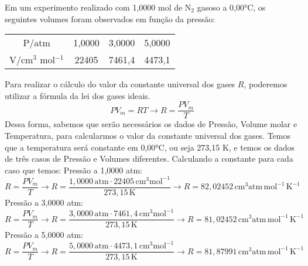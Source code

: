 \begin{xcs}
    Em um experimento realizado com 1,0000 mol de N\(_2\) gasoso a 0,00°C, os
    seguintes volumes foram observados em função da pressão: 
    \begin{center}
    \begin{tabular}{c | c c c}
    \hline
        P/atm & 1,0000 & 3,0000 & 5,0000\\
        V/cm\(^3\) mol\(^{-1}\) & 22405 & 7461,4 & 4473,1\\
    \hline
    \end{tabular}
    \end{center}
\end{xcs}
\begin{rsl}
    Para realizar o cálculo do valor da constante universal dos gases \( R \),
    poderemos utilizar a fórmula da lei dos gases ideais.  
    \[ PV_m = RT \rightarrow R = \frac{PV_m}{T} \] 
    Dessa forma, sabemos que serão necessários
    os dados de Pressão, Volume molar e Temperatura, para calcularmos o valor da
    constante universal dos gases.  Temos que a temperatura será constante em
    0,00°C, ou seja 273,15 K, e temos os dados de três casos de Pressão e
    Volumes diferentes.  Calculando a constante para cada caso que temos:
    Pressão a 1,0000 atm: 
    \[ R = \frac{PV_m}{T} \rightarrow R = \frac{1,0000 \, \text{atm} \cdot 22405
    \, \text{cm}^3 \text{mol}^{-1}}{273,15 \, \text{K}} \rightarrow R = 82,02452
    \, \text{cm}^3 \text{atm} \, \text{mol}^{-1} \, \text{K}^{-1} \] 
    Pressão a 3,0000 atm: 
    \[ R = \frac{PV_m}{T} \rightarrow R =
    \frac{3,0000 \, \text{atm} \cdot 7461,4 \, \text{cm}^3
    \text{mol}^{-1}}{273,15 \, \text{K}} \rightarrow R = 81,02452 \, \text{cm}^3
    \text{atm} \, \text{mol}^{-1} \, \text{K}^{-1} \] 
    Pressão a 5,0000 atm: 
    \[ R = \frac{PV_m}{T} \rightarrow R = \frac{5,0000 \, \text{atm} \cdot
    4473,1 \, \text{cm}^3 \text{mol}^{-1}}{273,15 \, \text{K}} \rightarrow R =
    81,87991 \, \text{cm}^3 \text{atm} \, \text{mol}^{-1} \, \text{K}^{-1} \]
\end{rsl}

